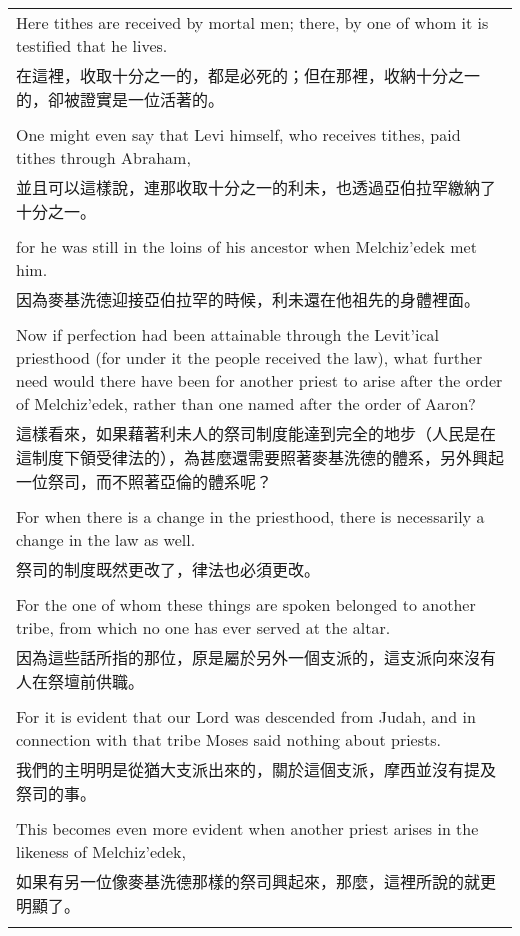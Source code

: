 \begin{tabularx}{\textwidth}{p{}}
Here tithes are received by mortal men; there, by one of whom it is testified that he lives. \\
在這裡，收取十分之一的，都是必死的；但在那裡，收納十分之一的，卻被證實是一位活著的。 \\ \\
One might even say that Levi himself, who receives tithes, paid tithes through Abraham, \\
並且可以這樣說，連那收取十分之一的利未，也透過亞伯拉罕繳納了十分之一。 \\ \\
for he was still in the loins of his ancestor when Melchiz'edek met him. \\
因為麥基洗德迎接亞伯拉罕的時候，利未還在他祖先的身體裡面。 \\ \\
Now if perfection had been attainable through the Levit'ical priesthood (for under it the people received the law), what further need would there have been for another priest to arise after the order of Melchiz'edek, rather than one named after the order of Aaron? \\
這樣看來，如果藉著利未人的祭司制度能達到完全的地步（人民是在這制度下領受律法的），為甚麼還需要照著麥基洗德的體系，另外興起一位祭司，而不照著亞倫的體系呢？ \\ \\
For when there is a change in the priesthood, there is necessarily a change in the law as well. \\
祭司的制度既然更改了，律法也必須更改。 \\ \\
For the one of whom these things are spoken belonged to another tribe, from which no one has ever served at the altar. \\
因為這些話所指的那位，原是屬於另外一個支派的，這支派向來沒有人在祭壇前供職。 \\ \\
For it is evident that our Lord was descended from Judah, and in connection with that tribe Moses said nothing about priests. \\
我們的主明明是從猶大支派出來的，關於這個支派，摩西並沒有提及祭司的事。 \\ \\
This becomes even more evident when another priest arises in the likeness of Melchiz'edek, \\
如果有另一位像麥基洗德那樣的祭司興起來，那麼，這裡所說的就更明顯了。 \\ \\

\end{tabularx}
